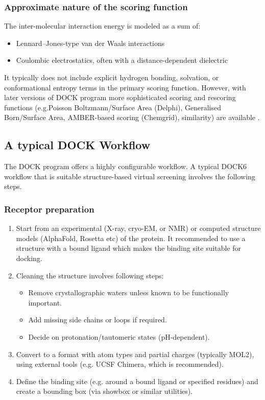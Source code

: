 \documentclass[12pt, a4paper]{article}
\begin{document}
\subsubsection{Approximate nature of the scoring function}

The inter-molecular interaction energy is modeled as a sum of:
\begin{itemize}
  \item Lennard–Jones-type van der Waals interactions
  \item Coulombic electrostatics, often with a distance-dependent dielectric
\end{itemize}

It typically does not include explicit hydrogen bonding, solvation, or conformational entropy terms in the primary scoring function\cite{CH7_Meng1992Grid}. However, with later versions of DOCK program more sophisticated scoring and rescoring functions (e.g.Poisson Boltzmann/Surface Area (Delphi), Generalised Born/Surface Area, AMBER-based scoring (Chemgrid),
similarity) are available \cite{CH7_Allen2015,CH7_Brozell2012}. 


\subsection{A typical DOCK Workflow}

The DOCK program offers a highly configurable workflow. A typical DOCK6 workflow that is suitable structure-based virtual screening involves the following steps\cite{CH7_Allen2015}.

\subsubsection{Receptor preparation}

\begin{enumerate}
  \item Start from an experimental (X-ray, cryo-EM, or NMR) or computed structure models (AlphaFold, Rosetta etc)  of the protein. It recommended to use a structure with a bound ligand which makes the binding site suitable for docking.
    \item Cleaning the structure involves following steps:
        \begin{itemize}
          \item Remove crystallographic waters unless known to be functionally important.
          \item Add missing side chains or loops if required.
          \item Decide on protonation/tautomeric states (pH-dependent).
        \end{itemize}

  \item Convert to a format with atom types and partial charges
        (typically MOL2), using external tools (e.g. UCSF Chimera, which is recommended).
  \item Define the binding site (e.g. around a bound ligand or specified residues) and create a bounding box (via
        showbox or similar utilities).
\end{enumerate}
\end{document}
